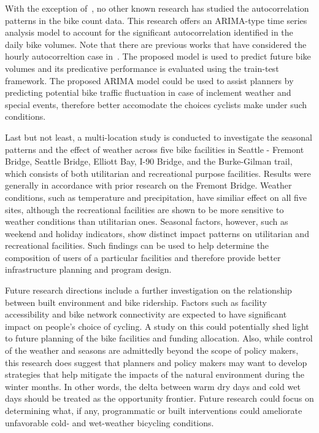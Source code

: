 \documentclass [11pt, proquest] {uwthesis}[2015/03/03]
\begin{document}
With the exception of~\cite{Gallop:2012aa,Nosal:2014aa}, no other known research has studied the autocorrelation patterns in the bike count data. This research offers an ARIMA-type time series analysis model to account for the significant autocorrelation identified in the daily bike volumes. Note that there are previous works that have considered the hourly autocorreltion case in~\cite{Gallop:2012aa,Nosal:2014aa}. The proposed model is used to predict future bike volumes and its predicative performance is evaluated using the train-test framework. The proposed ARIMA model could be used to assist planners by predicting potential bike traffic fluctuation in case of inclement weather and special events, therefore better accomodate the choices cyclists make under such conditions. 

Last but not least, a multi-location study is conducted to investigate the seasonal patterns and the effect of weather across five bike facilities in Seattle - Fremont Bridge, Seattle Bridge, Elliott Bay, I-90 Bridge, and the Burke-Gilman trail, which consists of both utilitarian and recreational purpose facilities. Results were generally in accordance with prior research on the Fremont Bridge. Weather conditions, such as temperature and precipitation, have similiar effect on all five sites, although the recreational facilities are shown to be more sensitive to weather conditions than utilitarian ones. Seasonal factors, however, such as weekend and holiday indicators, show distinct impact patterns on utilitarian and recreational facilities. Such findings can be used to help determine the composition of users of a particular facilities and therefore provide better infrastructure planning and program design. 

Future research directions include a further investigation on the relationship between built environment and bike ridership. Factors such as facility accessibility and bike network connectivity are expected to have significant impact on people's choice of cycling. A study on this could potentially shed light to future planning of the bike facilities and funding allocation. Also, while control of the weather and seasons are admittedly beyond the scope of policy makers, this research does suggest that planners and policy makers may want to develop strategies that help mitigate the impacts of the natural environment during the winter months. In other words, the delta between warm dry days and cold wet days should be treated as the opportunity frontier. Future research could focus on determining what, if any, programmatic or built interventions could ameliorate unfavorable cold- and wet-weather bicycling conditions.


%
%



%
%
\appendix
\raggedbottom\sloppy
 
 
\end{document}
